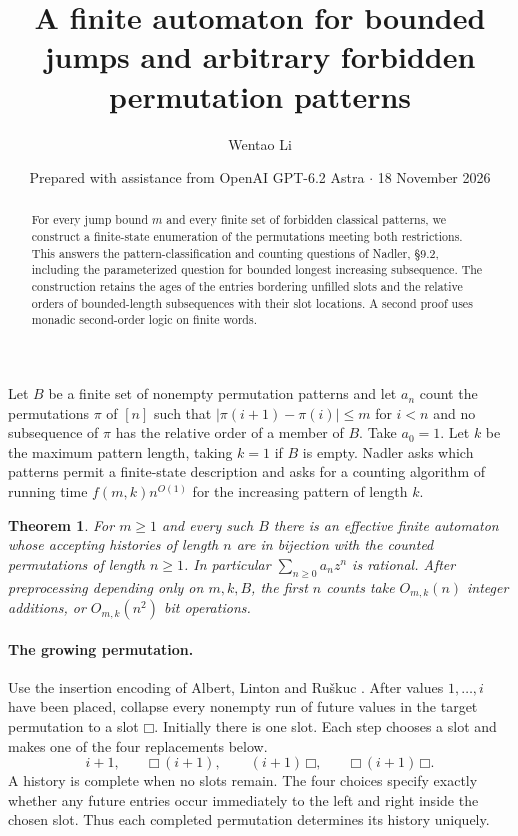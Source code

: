 \documentclass[11pt]{article}
\title{A finite automaton for bounded jumps and arbitrary forbidden permutation patterns}
\author{Wentao Li}
\date{Prepared with assistance from OpenAI GPT-6.2 Astra $\cdot$ 18 November 2026}
\newtheorem{theorem}{Theorem}
\newcommand{\slot}{\mathord{\Box}}
\begin{document}
\maketitle
\begin{abstract}
For every jump bound $m$ and every finite set of forbidden classical patterns, we construct a finite-state enumeration of the permutations meeting both restrictions. This answers the pattern-classification and counting questions of Nadler, \S9.2, including the parameterized question for bounded longest increasing subsequence. The construction retains the ages of the entries bordering unfilled slots and the relative orders of bounded-length subsequences with their slot locations. A second proof uses monadic second-order logic on finite words.
\end{abstract}

Let $B$ be a finite set of nonempty permutation patterns and let $a_n$ count the permutations $\pi$ of $[n]$ such that $|\pi(i+1)-\pi(i)|\le m$ for $i<n$ and no subsequence of $\pi$ has the relative order of a member of $B$. Take $a_0=1$. Let $k$ be the maximum pattern length, taking $k=1$ if $B$ is empty. Nadler \cite[\S9.2]{nadler} asks which patterns permit a finite-state description and asks for a counting algorithm of running time $f(m,k)n^{O(1)}$ for the increasing pattern of length $k$.

\begin{theorem}
For $m\ge1$ and every such $B$ there is an effective finite automaton whose accepting histories of length $n$ are in bijection with the counted permutations of length $n\ge1$. In particular $\sum_{n\ge0}a_nz^n$ is rational. After preprocessing depending only on $m,k,B$, the first $n$ counts take $O_{m,k}(n)$ integer additions, or $O_{m,k}(n^2)$ bit operations.
\end{theorem}

\paragraph{The growing permutation.}
Use the insertion encoding of Albert, Linton and Ru\v skuc \cite{alr}. After values $1,\ldots,i$ have been placed, collapse every nonempty run of future values in the target permutation to a slot $\slot$. Initially there is one slot. Each step chooses a slot and makes one of the four replacements below.
\[
 i+1,\qquad \slot\,(i+1),\qquad (i+1)\,\slot,\qquad \slot\,(i+1)\,\slot.
\]
A history is complete when no slots remain. The four choices specify exactly whether any future entries occur immediately to the left and right inside the chosen slot. Thus each completed permutation determines its history uniquely.
\end{document}
